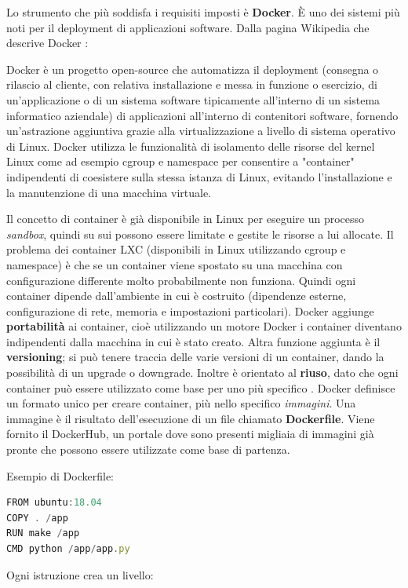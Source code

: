 \documentclass[a4paper,10pt]{memoir}
\begin{document}
Lo strumento che più soddisfa i requisiti imposti è \textbf{Docker}.
È uno dei sistemi più noti per il deployment di applicazioni software. Dalla pagina Wikipedia che descrive Docker
\cite{wikidocker}:
\begin{quoting}[font=itshape, begintext={``}, endtext={``}]
Docker è un progetto open-source che automatizza il deployment (consegna o rilascio al cliente, con relativa installazione e messa in funzione o esercizio, di un'applicazione o di un sistema software tipicamente all'interno di un sistema informatico aziendale) di applicazioni all'interno di contenitori software, fornendo un'astrazione aggiuntiva grazie alla virtualizzazione a livello di sistema operativo di Linux. Docker utilizza le funzionalità di isolamento delle risorse del kernel Linux come ad esempio cgroup e namespace per consentire a "container" indipendenti di coesistere sulla stessa istanza di Linux, evitando l'installazione e la manutenzione di una macchina virtuale.
\end{quoting}

Il concetto di container è già disponibile in Linux per eseguire un processo \textit{sandbox}, quindi su sui possono essere limitate e gestite le risorse a lui allocate. Il problema dei container LXC (disponibili in Linux utilizzando cgroup e namespace) è che se un container viene spostato su una macchina con configurazione differente molto probabilmente non funziona. Quindi ogni container dipende dall'ambiente in cui è costruito (dipendenze esterne, configurazione di rete, memoria e
impostazioni particolari). Docker aggiunge \textbf{portabilità} ai container, cioè utilizzando un motore Docker i container diventano indipendenti dalla macchina in cui è stato creato. Altra funzione aggiunta è il \textbf{versioning}; si può tenere traccia delle varie versioni di un container, dando la possibilità di un upgrade o downgrade. Inoltre è orientato al \textbf{riuso},     dato che ogni container può essere utilizzato come base per uno più specifico \cite{docker-portability}.
Docker definisce un formato unico per creare container, più nello specifico \textit{immagini}. Una immagine è il risultato dell'esecuzione di un file chiamato \textbf{Dockerfile}. Viene fornito il DockerHub, un portale dove sono presenti migliaia di immagini già pronte che possono essere utilizzate come base di partenza.

\vspace{0.02\textwidth}
\begin{center}
Esempio di Dockerfile:
\begin{lstlisting}[language=Javascript]
FROM ubuntu:18.04
COPY . /app
RUN make /app
CMD python /app/app.py
\end{lstlisting}
\end{center}
Ogni istruzione crea un livello:
\end{document}

